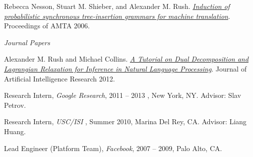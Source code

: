 \documentclass[11pt]{article}
\begin{document}
{\medskip
\ind Rebecca Nesson, Stuart M. Shieber, and Alexander M. Rush. \emph{\href{http://www.eecs.harvard.edu/~shieber/Biblio/Papers/Nesson-2006-IPS.pdf}{Induction of probabilistic synchronous tree-insertion grammars for machine translation}}. Proceedings of AMTA 2006.

\vspace{0.3in}

\noindent\emph{Journal Papers \vspace{0.01in}}

\ind Alexander M. Rush and Michael Collins. \emph{\href{http://www.cs.columbia.edu/~mcollins/acltutorial.pdf}{A Tutorial on Dual Decomposition and Lagrangian Relaxation for Inference in Natural Language Processing}}. Journal of Artificial Intelligence Research 2012.

 \bigskip






\bigskip

\ind Research Intern, {\sl Google Research}, 2011 -- 2013 , New York, NY.  Advisor: Slav Petrov.



\ind Research Intern, {\sl USC/ISI },  Summer 2010, Marina Del Rey, CA. Advisor: Liang Huang.

\bigskip



\medskip
\ind  Lead Engineer (Platform Team), {\sl Facebook}, 2007 -- 2009, Palo Alto, CA.




}
\end{document}
